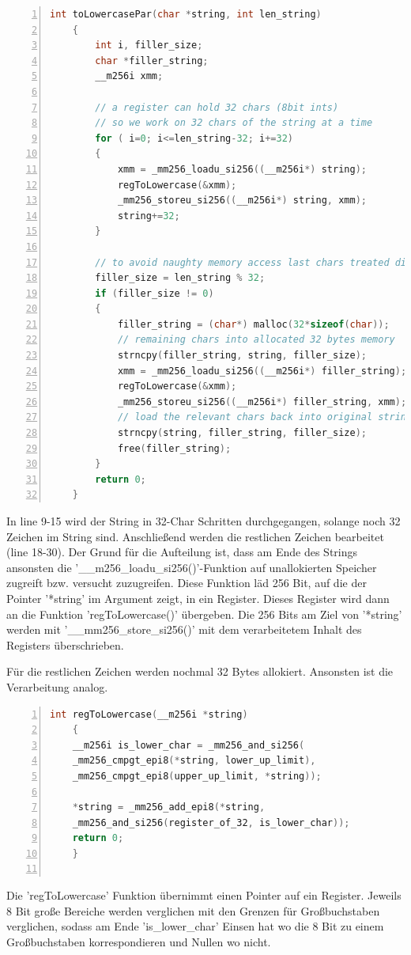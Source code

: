 \documentclass[plainarticle,zihtitle,german,final,hyperref,utf8]{zihpub}
\begin{document}
\begin{lstlisting}[language=c, numbers=left]
	int toLowercasePar(char *string, int len_string)
	{
		int i, filler_size;
		char *filler_string;
		__m256i xmm;
		
		// a register can hold 32 chars (8bit ints)
		// so we work on 32 chars of the string at a time
		for ( i=0; i<=len_string-32; i+=32)
		{
			xmm = _mm256_loadu_si256((__m256i*) string);
			regToLowercase(&xmm);
			_mm256_storeu_si256((__m256i*) string, xmm);
			string+=32;
		}
		
		// to avoid naughty memory access last chars treated different
		filler_size = len_string % 32;
		if (filler_size != 0)
		{
			filler_string = (char*) malloc(32*sizeof(char));
			// remaining chars into allocated 32 bytes memory
			strncpy(filler_string, string, filler_size);
			xmm = _mm256_loadu_si256((__m256i*) filler_string);
			regToLowercase(&xmm);
			_mm256_storeu_si256((__m256i*) filler_string, xmm);	
			// load the relevant chars back into original string
			strncpy(string, filler_string, filler_size);
			free(filler_string);
		}
		return 0;
	}
\end{lstlisting}

In line 9-15 wird der String in 32-Char Schritten durchgegangen, solange noch 32 Zeichen im String sind.
Anschließend werden die restlichen Zeichen bearbeitet (line 18-30). Der Grund für die Aufteilung ist, dass am Ende des Strings ansonsten die '\_\_m256\_loadu\_si256()'-Funktion auf unallokierten Speicher zugreift bzw. versucht zuzugreifen. Diese Funktion läd 256 Bit, auf die der Pointer '{*}string' im Argument zeigt, in ein Register.
Dieses Register wird dann an die Funktion 'regToLowercase()' übergeben. Die 256 Bits am Ziel von '{*}string' werden mit '\_\_mm256\_store\_si256()' mit dem verarbeitetem Inhalt des Registers überschrieben.

Für die restlichen Zeichen werden nochmal 32 Bytes allokiert. Ansonsten ist die Verarbeitung analog.

\begin{lstlisting}[language=c, numbers=left]
	int regToLowercase(__m256i *string)
	{
	__m256i is_lower_char = _mm256_and_si256(
	_mm256_cmpgt_epi8(*string, lower_up_limit),
	_mm256_cmpgt_epi8(upper_up_limit, *string));

	*string = _mm256_add_epi8(*string,
	_mm256_and_si256(register_of_32, is_lower_char));
	return 0;
	}
	
\end{lstlisting}

Die 'regToLowercase' Funktion übernimmt einen Pointer auf ein Register. Jeweils 8 Bit große Bereiche werden verglichen mit den Grenzen für Großbuchstaben verglichen, sodass am Ende 'is\_lower\_char' Einsen hat wo die 8 Bit zu einem Großbuchstaben korrespondieren und Nullen wo nicht.
\end{document}
